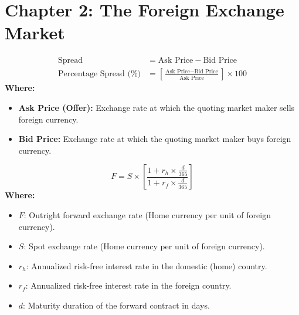 \section*{Chapter 2: The Foreign Exchange Market}

\begin{formulabox}
\begin{align*}
    \text{Spread} &= \text{Ask Price} - \text{Bid Price} \\[0.3em]
    \text{Percentage Spread (\%)} &= \left[ \frac{\text{Ask Price} - \text{Bid Price}}{\text{Ask Price}} \right] \times 100
\end{align*}
\textbf{Where:}
\begin{itemize}[leftmargin=*, noitemsep]
    \item \textbf{Ask Price (Offer):} Exchange rate at which the quoting market maker sells foreign currency.
    \item \textbf{Bid Price:} Exchange rate at which the quoting market maker buys foreign currency.
\end{itemize}
\end{formulabox}

\begin{formulabox}
\begin{equation*}
    F = S \times \left[ \frac{1 + r_h \times \frac{d}{365}}{1 + r_f \times \frac{d}{365}} \right]
\end{equation*}
\textbf{Where:}
\begin{itemize}[leftmargin=*, noitemsep]
    \item $F$: Outright forward exchange rate (Home currency per unit of foreign currency).
    \item $S$: Spot exchange rate (Home currency per unit of foreign currency).
    \item $r_h$: Annualized risk-free interest rate in the domestic (home) country.
    \item $r_f$: Annualized risk-free interest rate in the foreign country.
    \item $d$: Maturity duration of the forward contract in days.
\end{itemize}
\end{formulabox}

